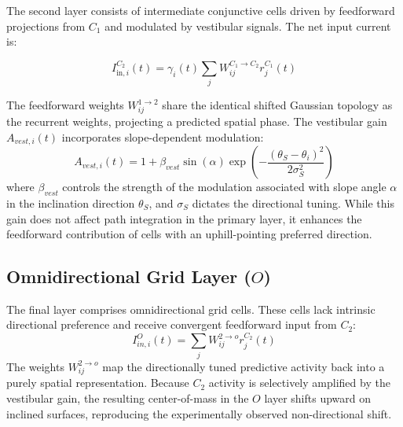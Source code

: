 \documentclass{article}
\begin{document}
The second layer consists of intermediate conjunctive cells driven by feedforward projections from $C_1$ and modulated by vestibular signals. The net input current is:

\begin{equation}
    I_{\text{in},i}^{C_2}(t)=\gamma_i(t) \sum_j W_{ij}^{C_1 \to C_2} r_j^{C_1}(t)
\end{equation}

The feedforward weights $W_{ij}^{1 \to 2}$ share the identical shifted Gaussian topology as the recurrent weights, projecting a predicted spatial phase. The vestibular gain $A_{vest, i}(t)$ incorporates slope-dependent modulation:
$$A_{vest, i}(t)=1 + \beta_{vest} \sin(\alpha) \exp\left(-\frac{(\theta_S - \theta_i)^2}{2\sigma_S^2}\right)$$
where $\beta_{vest}$ controls the strength of the modulation associated with slope angle $\alpha$ in the inclination direction $\theta_S$, and $\sigma_S$ dictates the directional tuning. While this gain does not affect path integration in the primary layer, it enhances the feedforward contribution of cells with an uphill-pointing preferred direction.

\subsection*{Omnidirectional Grid Layer ($O$)}
The final layer comprises omnidirectional grid cells. These cells lack intrinsic directional preference and receive convergent feedforward input from $C_2$:
$$I_{in,i}^{O}(t)=\sum_j W_{ij}^{2 \to o} r_j^{C_2}(t)$$
The weights $W_{ij}^{2 \to o}$ map the directionally tuned predictive activity back into a purely spatial representation. Because $C_2$ activity is selectively amplified by the vestibular gain, the resulting center-of-mass in the $O$ layer shifts upward on inclined surfaces, reproducing the experimentally observed non-directional shift.
\end{document}
